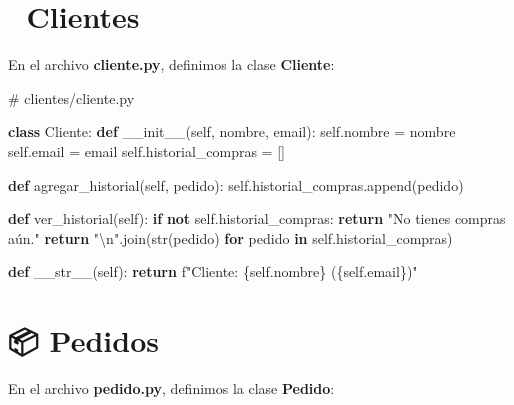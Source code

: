 \documentclass[
  a4paper,
  DIV=11,
  numbers=noendperiod,
  onepage,
  openany]{scrreprt}
\newenvironment{Shaded}{\begin{snugshade}}{\end{snugshade}}
\newcommand{\BuiltInTok}[1]{\textcolor[rgb]{0.00,0.23,0.31}{#1}}
\newcommand{\CharTok}[1]{\textcolor[rgb]{0.13,0.47,0.30}{#1}}
\newcommand{\CommentTok}[1]{\textcolor[rgb]{0.37,0.37,0.37}{#1}}
\newcommand{\ControlFlowTok}[1]{\textcolor[rgb]{0.00,0.23,0.31}{\textbf{#1}}}
\newcommand{\FunctionTok}[1]{\textcolor[rgb]{0.28,0.35,0.67}{#1}}
\newcommand{\KeywordTok}[1]{\textcolor[rgb]{0.00,0.23,0.31}{\textbf{#1}}}
\newcommand{\NormalTok}[1]{\textcolor[rgb]{0.00,0.23,0.31}{#1}}
\newcommand{\OperatorTok}[1]{\textcolor[rgb]{0.37,0.37,0.37}{#1}}
\newcommand{\SpecialCharTok}[1]{\textcolor[rgb]{0.37,0.37,0.37}{#1}}
\newcommand{\SpecialStringTok}[1]{\textcolor[rgb]{0.13,0.47,0.30}{#1}}
\newcommand{\StringTok}[1]{\textcolor[rgb]{0.13,0.47,0.30}{#1}}
\newcommand{\VariableTok}[1]{\textcolor[rgb]{0.07,0.07,0.07}{#1}}
\begin{document}
\section{👤 Clientes}\label{clientes}

En el archivo \textbf{cliente.py}, definimos la clase \textbf{Cliente}:

\begin{Shaded}
\begin{Highlighting}[]
\CommentTok{\# clientes/cliente.py}

\KeywordTok{class}\NormalTok{ Cliente:}
    \KeywordTok{def} \FunctionTok{\_\_init\_\_}\NormalTok{(}\VariableTok{self}\NormalTok{, nombre, email):}
        \VariableTok{self}\NormalTok{.nombre }\OperatorTok{=}\NormalTok{ nombre}
        \VariableTok{self}\NormalTok{.email }\OperatorTok{=}\NormalTok{ email}
        \VariableTok{self}\NormalTok{.historial\_compras }\OperatorTok{=}\NormalTok{ []}

    \KeywordTok{def}\NormalTok{ agregar\_historial(}\VariableTok{self}\NormalTok{, pedido):}
        \VariableTok{self}\NormalTok{.historial\_compras.append(pedido)}

    \KeywordTok{def}\NormalTok{ ver\_historial(}\VariableTok{self}\NormalTok{):}
        \ControlFlowTok{if} \KeywordTok{not} \VariableTok{self}\NormalTok{.historial\_compras:}
            \ControlFlowTok{return} \StringTok{"No tienes compras aún."}
        \ControlFlowTok{return} \StringTok{"}\CharTok{\textbackslash{}n}\StringTok{"}\NormalTok{.join(}\BuiltInTok{str}\NormalTok{(pedido) }\ControlFlowTok{for}\NormalTok{ pedido }\KeywordTok{in} \VariableTok{self}\NormalTok{.historial\_compras)}

    \KeywordTok{def} \FunctionTok{\_\_str\_\_}\NormalTok{(}\VariableTok{self}\NormalTok{):}
        \ControlFlowTok{return} \SpecialStringTok{f"Cliente: }\SpecialCharTok{\{}\VariableTok{self}\SpecialCharTok{.}\NormalTok{nombre}\SpecialCharTok{\}}\SpecialStringTok{ (}\SpecialCharTok{\{}\VariableTok{self}\SpecialCharTok{.}\NormalTok{email}\SpecialCharTok{\}}\SpecialStringTok{)"}
\end{Highlighting}
\end{Shaded}

\section{📦 Pedidos}\label{pedidos}

En el archivo \textbf{pedido.py}, definimos la clase \textbf{Pedido}:
\end{document}
